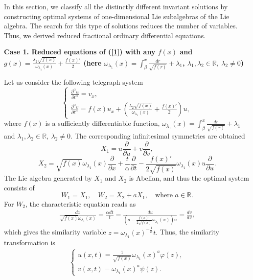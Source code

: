 \documentclass[12pt]{amsart}
\begin{document}
In this section, we classify all the distinctly different invariant solutions by constructing optimal systems of one-dimensional Lie subalgebras of the Lie algebra. The search for this type of solutions reduces the number of variables. Thus, we derived reduced fractional ordinary differential equations. 

\textbf{Case 1. Reduced equations of (\ref{1}) with any $f(x)$ and $g(x)=\frac{\lambda_2\sqrt{f(x)}}{\omega_{\lambda_1}(x)}+\frac{f(x)'}{2}$ (here $\omega_{\lambda_1}(x)=\int_\beta^x \frac{dr}{\sqrt{f(r)}} +\lambda_1$, $\lambda_1,\lambda_2\in \mathbb{R},~ \lambda_2\ne 0$)} 

Let us consider the following telegraph system
\begin{equation}
\label{eq:TEcaseA2}
\begin{cases}
\frac{\partial^\alpha u}{\partial t^\alpha}=v_x,\\
\frac{\partial^\alpha v}{\partial t^\alpha}=f(x) u_x+
\left (\frac{\lambda_2\sqrt{f(x)}}{\omega_{\lambda_1}(x)}+\frac{f(x)'}{2}\right)u,
\end{cases}
\end{equation}
where $f(x)$ is a sufficiently differentiable function, $\omega_{\lambda_1}(x)=\int_\beta^x \frac{dr}{\sqrt{f(r)}} +\lambda_1$ and $\lambda_1,\lambda_2\in \mathbb{R},~ \lambda_2\ne 0$. The corresponding infinitesimal symmetries are obtained
\begin{equation*}
 X_1=u\frac{\partial}{\partial u}+v\frac{\partial}{\partial v},
 \end{equation*}
 \begin{equation*}
 X_2=\sqrt{f(x)}\omega_{\lambda_1}(x)\frac{\partial}{\partial x}
    +\frac{t}{\alpha}\frac{\partial}{\partial t}-\frac{f(x)'}{2\sqrt{f(x)}}\omega_{\lambda_1}(x)u \frac{\partial}{\partial u}.
\end{equation*}
The Lie algebra generated by $X_1$ and $X_2$ is Abelian, and thus the optimal system consists of
$$W_1=X_1,\quad W_2=X_2+aX_1,\quad\text{where }a\in \mathbb{R}.$$
For $W_2$, the characteristic equation reads as
\begin{eqnarray}
\frac{dx}{\sqrt{f(x)}\omega_{\lambda_1}(x)}=
\frac{\alpha dt}{t}=
\frac{du}{\left(a-\frac{f(x)'}{2\sqrt{f(x)}}\omega_{\lambda_1}(x)\right)u}
=\frac{dv}{av},
\end{eqnarray}
which gives the similarity variable
$
z=\omega_{\lambda_1}(x)^{-\frac{1}{\alpha}}t.
$ Thus, the similarity transformation is
\begin{eqnarray}
\label{eq:ST_thm_ii}
\begin{cases}
u(x,t)=\frac{1}{\sqrt{f(x)}}\omega_{\lambda_1}(x)^{a}\varphi(z),\\
v(x,t)=\omega_{\lambda_1}(x)^a\psi(z).
\end{cases}
\end{eqnarray}
\end{document}

